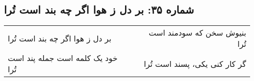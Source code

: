 \begin{center}
\section*{شماره ۳۵: بر دل ز هوا اگر چه بند است تُرا}
\label{sec:035}
\begin{longtable}{l p{0.5cm} r}
بر دل ز هوا اگر چه بند است تُرا
&&
بنیوش سخن که سودمند است تُرا
\\
خود یک کلمه است جمله پند است تُرا
&&
گر کار کنی یکی، پسند است تُرا
\\
\end{longtable}
\end{center}
